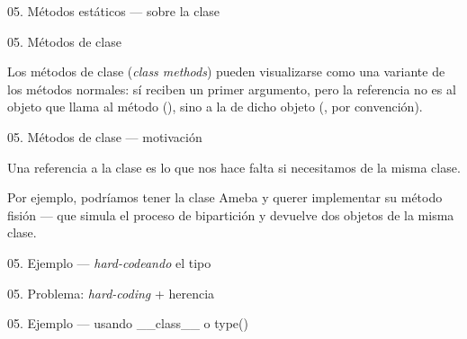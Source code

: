 \begin{frame}{05. Métodos estáticos — sobre la clase}
  \footnotesize
\end{frame}

\begin{frame}{05. Métodos de clase}
  \begin{block}{}
    \centering
    Los métodos de clase (\textit{class methods}) pueden visualizarse
    como una variante de los métodos normales: sí reciben un primer
    argumento, pero la referencia no es al objeto que llama al método
    (), sino a la  de dicho objeto
    (, por convención).
  \end{block}
\end{frame}

\begin{frame}{05. Métodos de clase — motivación}
  \begin{alertblock}{}
    \centering
     Una referencia a la clase es lo que nos hace falta si necesitamos
      de la misma clase.
  \end{alertblock}

  \begin{center}
    \small
    Por ejemplo, podríamos tener la clase Ameba y querer implementar
    su método fisión — que simula el proceso de bipartición y devuelve
    dos objetos de la misma clase.
  \end{center}
\end{frame}

\begin{frame}{05. Ejemplo — \textit{hard-codeando} el tipo}
  \scriptsize
\end{frame}

\begin{frame}{05. Problema: \textit{hard-coding} + herencia}
  \scriptsize
\end{frame}

\begin{frame}{05. Ejemplo — usando  \_\_class\_\_ o type()}
  \scriptsize
\end{frame}

